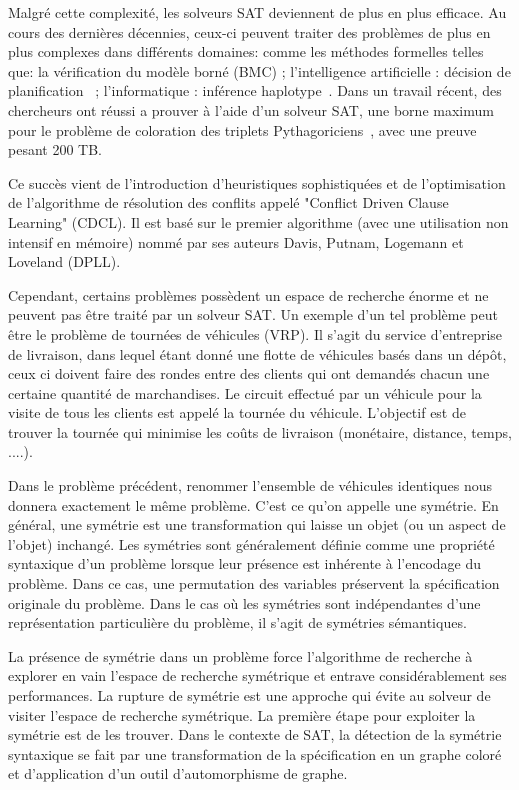 Malgré cette complexité, les solveurs SAT deviennent de plus en plus efficace.
Au cours des dernières décennies, ceux-ci peuvent traiter des problèmes de plus en plus complexes dans différents domaines: comme les méthodes formelles telles que: la vérification du modèle borné (BMC)\cite{bmc_99} ; l'intelligence artificielle : décision de planification~\cite{planning_92} ; l'informatique : inférence haplotype~\cite{biology_06}. 
Dans un travail récent, des chercheurs ont réussi a prouver à l'aide d'un solveur SAT, une borne maximum
pour le problème de coloration des triplets Pythagoriciens~\cite{heule2016solving}, avec une preuve pesant 200 TB.

Ce succès vient de l'introduction d'heuristiques sophistiquées et de l'optimisation de l'algorithme de
résolution des conflits appelé "Conflict Driven Clause Learning" (CDCL). Il est basé sur le premier
algorithme (avec une utilisation non intensif en mémoire) nommé par ses auteurs Davis, Putnam, Logemann
et Loveland (DPLL)\cite{dpll_62}.


Cependant, certains problèmes possèdent un espace de recherche énorme et ne peuvent pas 
être traité par un solveur SAT. Un exemple d'un tel problème peut être le problème de tournées de véhicules (VRP). 
Il s'agit du service d'entreprise de livraison, dans lequel étant donné une flotte de véhicules basés dans un dépôt, ceux ci doivent faire des rondes entre des clients qui ont demandés chacun une certaine quantité de marchandises. Le circuit effectué par un véhicule pour la visite de tous les clients
est appelé la tournée du véhicule. L'objectif est de trouver la tournée qui minimise les coûts de livraison (monétaire, distance, temps, ....).


Dans le problème précédent, renommer l'ensemble de véhicules identiques nous donnera exactement le même problème. C'est ce qu'on appelle une symétrie. En général, une symétrie est une transformation qui laisse un objet (ou un aspect de l'objet) inchangé. Les symétries sont généralement définie comme une propriété syntaxique d'un problème lorsque leur présence est inhérente à l'encodage du problème.
Dans ce cas, une permutation des variables préservent la spécification originale du problème.
Dans le cas où les symétries sont indépendantes d'une représentation particulière du problème, il s'agit de symétries sémantiques.

La présence de symétrie dans un problème force l'algorithme de recherche à explorer en vain l'espace de recherche symétrique et entrave considérablement ses performances. La rupture de symétrie est une approche qui évite au solveur de visiter l'espace de recherche symétrique.
La première étape pour exploiter la symétrie est de les trouver. Dans le contexte de SAT, la détection de la symétrie syntaxique se fait par une transformation de la spécification en un graphe coloré et d'application d'un outil d'automorphisme de graphe.


